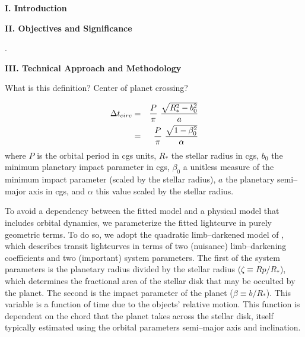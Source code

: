 \centerline{\bf I. Introduction}
\smallskip


\bigskip
\centerline{\bf II. Objectives and Significance}
\smallskip

.

\bigskip
\centerline{\bf III. Technical Approach and Methodology}
\smallskip

\medskip
{\centerline{}}
\smallskip

What is this definition?  Center of planet crossing?

\begin{eqnarray}
\Delta t_{circ} & = & {{P}\over{\pi}}~{{\sqrt{R_*^2 - b_0^2}}\over{a}} \nonumber \\
                & = & {{P}\over{\pi}}~{{\sqrt{1 - \beta_0^2}}\over{\alpha}}
\label{eq-tcirc}
\end{eqnarray}
where $P$ is the orbital period in cgs units, $R_*$ the stellar radius
in cgs, $b_0$ the minimum planetary impact parameter in cgs, $\beta_0$
a unitless measure of the minimum impact parameter (scaled by the
stellar radius), $a$ the planetary semi--major axis in cgs, and
$\alpha$ this value scaled by the stellar radius.


\medskip
{\centerline{}}
\smallskip

To avoid a dependency between the fitted model and a physical model
that includes orbital dynamics, we parameterize the fitted lightcurve
in purely geometric terms.  To do so, we adopt the quadratic
limb--darkened model of \cite{2002ApJ...580L.171M}, which describes
transit lightcurves in terms of two (nuisance) limb--darkening
coefficients and two (important) system parameters.  The first of the
system parameters is the planetary radius divided by the stellar
radius ($\zeta \equiv Rp/R_*$), which determines the fractional area
of the stellar disk that may be occulted by the planet.  The second is
the impact parameter of the planet ($\beta \equiv b/R_*$).  This
variable is a function of time due to the objects' relative motion.
This function is dependent on the chord that the planet takes across
the stellar disk, itself typically estimated using the orbital
parameters semi--major axis and inclination.

